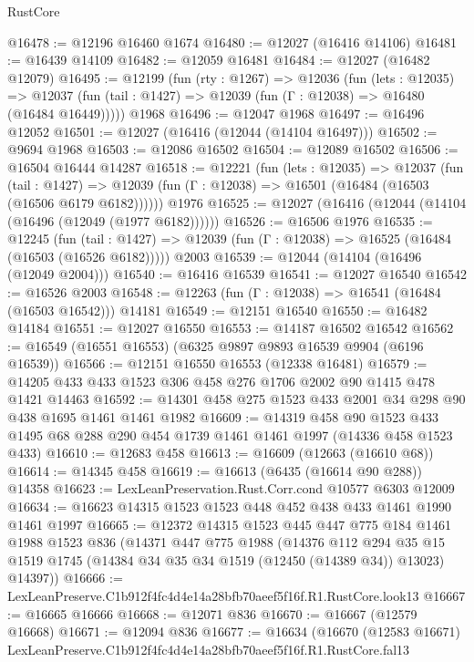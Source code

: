 \begin{lexlean}{RustCore}
\begin{coremodule}
@16478 := @12196 @16460 @1674
@16480 := @12027 (@16416 @14106)
@16481 := @16439 @14109
@16482 := @12059 @16481
@16484 := @12027 (@16482 @12079)
@16495 := @12199
    (fun (rty : @1267) =>
    @12036
      (fun (lets : @12035) =>
      @12037 (fun (tail : @1427) => @12039 (fun (Γ : @12038) => @16480 (@16484 @16449)))))
    @1968
@16496 := @12047 @1968
@16497 := @16496 @12052
@16501 := @12027 (@16416 (@12044 (@14104 @16497)))
@16502 := @9694 @1968
@16503 := @12086 @16502
@16504 := @12089 @16502
@16506 := @16504 @16444 @14287
@16518 := @12221
    (fun (lets : @12035) =>
    @12037
      (fun (tail : @1427) =>
      @12039 (fun (Γ : @12038) => @16501 (@16484 (@16503 (@16506 @6179 @6182))))))
    @1976
@16525 := @12027 (@16416 (@12044 (@14104 (@16496 (@12049 (@1977 @6182))))))
@16526 := @16506 @1976
@16535 := @12245
    (fun (tail : @1427) => @12039 (fun (Γ : @12038) => @16525 (@16484 (@16503 (@16526 @6182)))))
    @2003
@16539 := @12044 (@14104 (@16496 (@12049 @2004)))
@16540 := @16416 @16539
@16541 := @12027 @16540
@16542 := @16526 @2003
@16548 := @12263 (fun (Γ : @12038) => @16541 (@16484 (@16503 @16542))) @14181
@16549 := @12151 @16540
@16550 := @16482 @14184
@16551 := @12027 @16550
@16553 := @14187 @16502 @16542
@16562 := @16549 (@16551 @16553) (@6325 @9897 @9893 @16539 @9904 (@6196 @16539))
@16566 := @12151 @16550 @16553 (@12338 @16481)
@16579 := @14205 @433 @433 @1523 @306 @458 @276 @1706 @2002 @90 @1415 @478 @1421 @14463
@16592 := @14301 @458 @275 @1523 @433 @2001 @34 @298 @90 @438 @1695 @1461 @1461 @1982
@16609 := @14319
    @458
    @90
    @1523
    @433
    @1495
    @68
    @288
    @290
    @454
    @1739
    @1461
    @1461
    @1997
    (@14336 @458 @1523 @433)
@16610 := @12683 @458
@16613 := @16609 (@12663 (@16610 @68))
@16614 := @14345 @458
@16619 := @16613 (@6435 (@16614 @90 @288)) @14358
@16623 := LexLeanPreservation.Rust.Corr.cond @10577 @6303 @12009
@16634 := @16623 @14315 @1523 @1523 @448 @452 @438 @433 @1461 @1990 @1461 @1997
@16665 := @12372
    @14315
    @1523
    @445
    @447
    @775
    @184
    @1461
    @1988
    @1523
    @836
    (@14371
      @447
      @775
      @1988
      (@14376
        @112
        @294
        @35
        @15
        @1519
        @1745
        (@14384 @34 @35 @34 @1519 (@12450 (@14389 @34)) @13023)
        @14397))
@16666 := LexLeanPreserve.C1b912f4fc4d4e14a28bfb70aeef5f16f.R1.RustCore.look13
@16667 := @16665 @16666
@16668 := @12071 @836
@16670 := @16667 (@12579 @16668)
@16671 := @12094 @836
@16677 := @16634
    (@16670
      (@12583 @16671)
      LexLeanPreserve.C1b912f4fc4d4e14a28bfb70aeef5f16f.R1.RustCore.fal13

\end{coremodule}
\end{lexlean}
